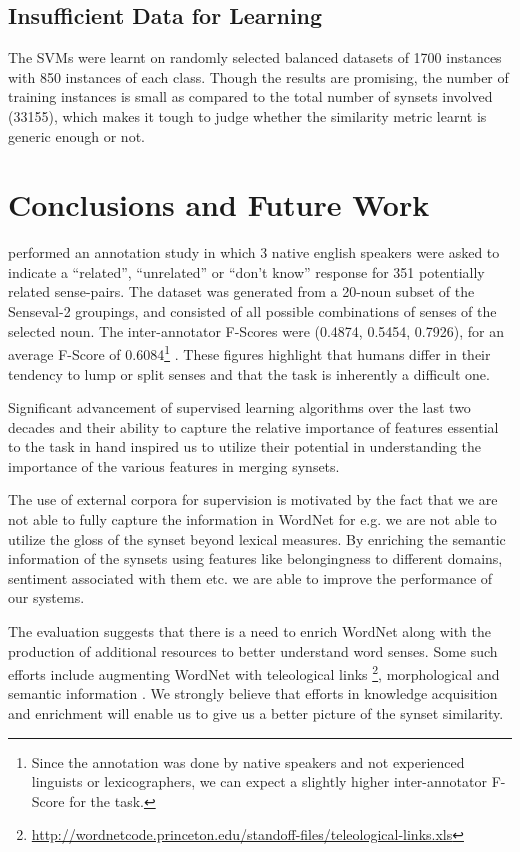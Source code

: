 \subsection{Insufficient Data for Learning}
The SVMs were learnt on randomly selected balanced datasets of 1700 instances with 850 instances of each class. Though the results are promising, the number of training instances is small as compared to the total number of synsets involved (33155), which makes it tough to judge whether the similarity metric learnt is generic enough or not.

\section{Conclusions and Future Work}
\citep{mccarthy2006relating} performed an annotation study in which 3 native english speakers were asked to indicate a ``related'', ``unrelated'' or ``don't know'' response for 351 potentially related sense-pairs. The dataset was generated from a 20-noun subset of the Senseval-2 groupings, and consisted of all possible combinations of senses of the selected noun. The inter-annotator F-Scores were (0.4874, 0.5454, 0.7926), for an average F-Score of 0.6084\footnote{Since the annotation was done by native speakers and not experienced linguists or lexicographers, we can expect a slightly higher inter-annotator F-Score for the task.} \citep{mccarthy2006relating} \citep{snow07mergesense}. These figures highlight that humans differ in their tendency to lump or split senses and that the task is inherently a difficult one.

Significant advancement of supervised learning algorithms over the last two decades and their ability to capture the relative importance of features essential to the task in hand inspired us to utilize their potential in understanding the importance of the various features in merging synsets.

The use of external corpora for supervision is motivated by the fact that we are not able to fully capture the information in WordNet for e.g. we are not able to utilize the gloss of the synset beyond lexical measures. By enriching the semantic information of the synsets using features like belongingness to different domains, sentiment associated with them etc. we are able to improve the performance of our systems. 

The evaluation suggests that there is a need to enrich WordNet along with the production of additional resources to better understand word senses. Some such efforts include augmenting WordNet with teleological links \footnote{\url{http://wordnetcode.princeton.edu/standoff-files/teleological-links.xls}}, morphological and semantic information \citep{morphosemanticLinks}. We strongly believe that efforts in knowledge acquisition and enrichment will enable us to give us a better picture of the synset similarity.




